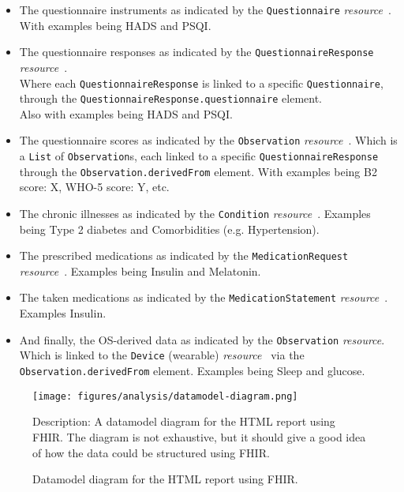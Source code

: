 \begin{itemize}
    \item The questionnaire instruments as indicated by the \texttt{Questionnaire} \emph{resource}~\cite{FHIR-Questionnaire-resource}. With examples being HADS and PSQI.
    \item The questionnaire responses as indicated by the \texttt{QuestionnaireResponse} \emph{resource}~\cite{FHIR-QuestionnaireResponse-resource}.
    \\
    Where each \texttt{QuestionnaireResponse} is linked to a specific \texttt{Questionnaire},
    \\
    through the \texttt{QuestionnaireResponse.questionnaire} element.
    \\
    Also with examples being HADS and PSQI.
    \item The questionnaire scores as indicated by the \texttt{Observation} \emph{resource}~\cite{FHIR-Observation-resource}. Which is a \texttt{List} of \texttt{Observation}s, each linked to a specific \texttt{QuestionnaireResponse} through the \texttt{Observation.derivedFrom} element. With examples being B2 score: X, WHO-5 score: Y, etc.
    \item The chronic illnesses as indicated by the \texttt{Condition} \emph{resource}~\cite{FHIR-Condition-resource}. Examples being Type 2 diabetes and Comorbidities (e.g. Hypertension).
    \item The prescribed medications as indicated by the \texttt{MedicationRequest} \emph{resource}~\cite{FHIR-MedicationRequest-resource}. Examples being Insulin and Melatonin.
    \item The taken medications as indicated by the \texttt{MedicationStatement} \emph{resource}~\cite{FHIR-MedicationStatement-resource}. Examples Insulin.
    \item And finally, the OS-derived data as indicated by the \texttt{Observation} \emph{resource}. Which is linked to the \texttt{Device} (wearable) \emph{resource}~\cite{FHIR-Device-resource} via the \texttt{Observation.derivedFrom} element. Examples being Sleep and glucose.
\end{itemize}

\begin{figure}[H]
    \centering
    \texttt{[image: figures/analysis/datamodel-diagram.png]}
    \caption{Datamodel diagram for the HTML report using FHIR.}
    \medskip
    \small
    \raggedright
    Description: A datamodel diagram for the HTML report using FHIR. The diagram is not exhaustive, but it should give a good idea of how the data could be structured using FHIR.
    \label{fig:datamodel-diagram}
\end{figure}

